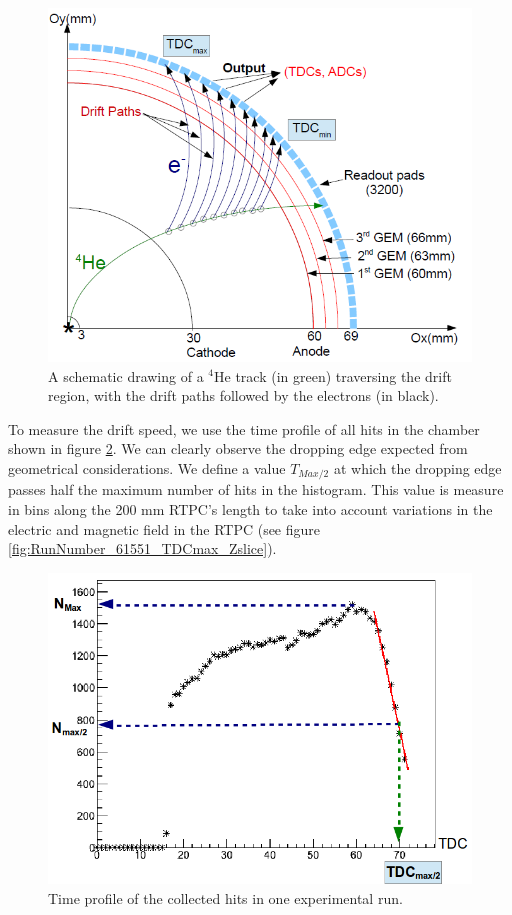 \documentclass[twocolumn,showpacs,superscriptaddress,groupedaddress]{revtex4}
\begin{document}
\begin{figure}[tb]
\centering
\includegraphics[scale=0.35]{fig/RTPC_2.png}
\caption[]{A schematic drawing of a $^{4}$He track (in green) traversing the 
drift region, with the drift paths followed by the electrons (in black). } 
\label{fig:RTPC_signals}
\end{figure}

To measure the drift speed, we use the time profile of all hits in the 
chamber shown in figure \ref{fig:TDC_profile}. We can clearly observe the 
dropping edge expected from geometrical considerations. We define a value $T_{Max/2}$ at 
which the dropping edge passes half the maximum number of hits in the 
histogram. This value is measure in bins along the 200 mm RTPC's length to take into 
account variations in the electric and magnetic field in the RTPC (see figure 
\ref{fig:RunNumber_61551_TDCmax_Zslice}). 

\begin{figure}[tb]
   \centering
   \includegraphics[scale=0.3]{fig/TDC_profile.png}
   \caption[]{Time profile of the collected hits in one experimental run.  } 
   \label{fig:TDC_profile}
\end{figure}
\end{document}

